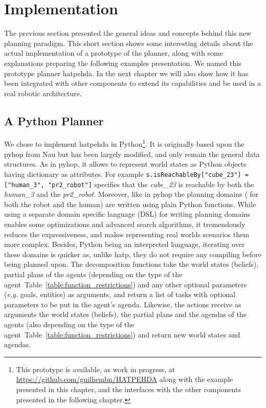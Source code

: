 \documentclass[a4paper,11pt,twoside]{StyleThese}
\begin{document}
\section{Implementation}
The previous section presented the general ideas and concepts behind this new planning paradigm. This short section shows some interesting details about the actual implementation of a prototype of the planner, along with some explanations preparing the following examples presentation. We named this prototype planner \acrfull{hatpehda}. In the next chapter we will also show how it has been integrated with other components to extend its capabilities and be used in a real robotic architecture.

\subsection{A Python Planner}
We chose to implement \acrshort{hatpehda} in Python\footnote{This prototype is available, as work in progress, at \url{https://github.com/guilhembn/HATPEHDA} along with the example presented in this chapter, and the interfaces with the other components presented in the following chapter.}. It is originally based upon the \acrfull{pyhop} from Nau but has been largely modified, and only remain the general data structures. As in \acrshort{pyhop}, it allows to represent world states as Python objects having dictionary as attributes. For example \verb|s.isReachableBy["cube_23"] = ["human_3", "pr2_robot"]| specifies that the \textit{cube\_23} is reachable by both the \textit{human\_3} and the \textit{pr2\_robot}. 
Moreover, like in \acrshort{pyhop} the planning domains ( for both the robot and the human) are written using plain Python functions. While using a separate domain specific language (DSL) for writing planning domains enables some optimizations and advanced search algorithms, it tremendously reduces the expressiveness, and makes representing real worlds scenarios them more complex. Besides, Python being an interpreted language, iterating over these domains is quicker as, unlike \acrshort{hatp}, they do not require any compiling before being planned upon.
The decomposition functions take the world states (beliefs), partial plans of the agents (depending on the type of the agent~Table~\ref{table:function_restrictions}) and any other optional parameters (\textit{e.g.} goals, entities) as arguments, and return a list of tasks with optional parameters to be put in the agent's agenda. Likewise, the actions receive as arguments the world states (beliefs), the partial plans and the agendas of the agents (also depending on the type of the agent~Table~\ref{table:function_restrictions}) and return new world states and agendas.
\end{document}

